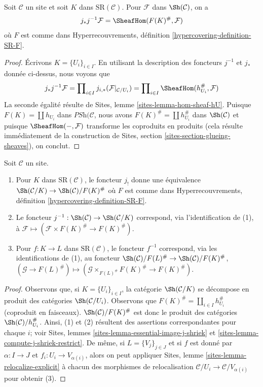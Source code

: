 \begin{lemma}
\label{lemma-push-pull-localization}
Soit $\mathcal{C}$ un site et soit $K$ dans $\text{SR}(\mathcal{C})$.
Pour $\mathcal{F}$ dans $\Sh(\mathcal{C})$, on a
$$
j_*j^{-1}\mathcal{F} = \SheafHom(F(K)^\#, \mathcal{F})
$$
où $F$ est comme dans
Hyperrecouvrements, définition \ref{hypercovering-definition-SR-F}.
\end{lemma}

\begin{proof}
Écrivons $K = \{U_i\}_{i \in I}$.
En utilisant la description des foncteurs $j^{-1}$ et $j_*$
donnée ci-dessus, nous voyons que
$$
j_*j^{-1}\mathcal{F} =
\prod\nolimits_{i \in I} j_{i, *}(\mathcal{F}|_{\mathcal{C}/U_i}) =
\prod\nolimits_{i \in I} \SheafHom(h_{U_i}^\#, \mathcal{F})
$$
La seconde égalité résulte de Sites, lemme \ref{sites-lemma-hom-sheaf-hU}.
Puisque $F(K) = \coprod h_{U_i}$ dans $\textit{PSh}(\mathcal{C}$,
nous avons $F(K)^\# = \coprod h_{U_i}^\#$ dans $\Sh(\mathcal{C})$
et puisque $\SheafHom(-, \mathcal{F})$ transforme les coproduits en
produits (cela résulte immédiatement de la construction de
Sites, section \ref{sites-section-glueing-sheaves}), on conclut.
\end{proof}

\begin{lemma}
\label{lemma-localize-compare}
Soit $\mathcal{C}$ un site.
\begin{enumerate}
\item Pour $K$ dans $\text{SR}(\mathcal{C})$, le foncteur $j_!$
donne une équivalence $\Sh(\mathcal{C}/K) \to \Sh(\mathcal{C})/F(K)^\#$
où $F$ est comme dans
Hyperrecouvrements, définition \ref{hypercovering-definition-SR-F}.
\item Le foncteur $j^{-1} : \Sh(\mathcal{C}) \to \Sh(\mathcal{C}/K)$
correspond, via l'identification de (1), à
$\mathcal{F} \mapsto (\mathcal{F} \times F(K)^\# \to F(K)^\#)$.
\item Pour $f : K \to L$ dans $\text{SR}(\mathcal{C})$, le foncteur
$f^{-1}$ correspond, via les identifications de (1), au foncteur
$\Sh(\mathcal{C})/F(L)^\# \to \Sh(\mathcal{C})/F(K)^\#$,
$(\mathcal{G} \to F(L)^\#) \mapsto
(\mathcal{G} \times_{F(L)^\#} F(K)^\# \to F(K)^\#)$.
\end{enumerate}
\end{lemma}

\begin{proof}
Observons que, si $K = \{U_i\}_{i \in I}$, la catégorie
$\Sh(\mathcal{C}/K)$ se décompose en produit des catégories
$\Sh(\mathcal{C}/U_i)$. Observons que
$F(K)^\# = \coprod_{i \in I} h_{U_i}^\#$ (coproduit en faisceaux).
$\Sh(\mathcal{C})/F(K)^\#$ est donc le produit des catégories
$\Sh(\mathcal{C})/h_{U_i}^\#$.
Ainsi, (1) et (2) résultent des assertions
correspondantes pour chaque $i$; voir
Sites, lemmes \ref{sites-lemma-essential-image-j-shriek} et
\ref{sites-lemma-compute-j-shriek-restrict}.
De même, si $L = \{V_j\}_{j \in J}$ et si $f$ est donné
par $\alpha : I \to J$ et $f_i : U_i \to V_{\alpha(i)}$,
alors on peut appliquer
Sites, lemme \ref{sites-lemma-relocalize-explicit}
à chacun des morphismes de relocalisation
$\mathcal{C}/U_i \to \mathcal{C}/V_{\alpha(i)}$
pour obtenir (3).
\end{proof}


